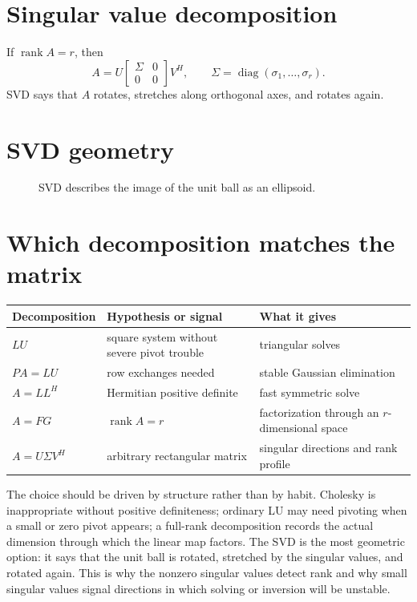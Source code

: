 \section{Singular value decomposition}
If \(\operatorname{rank}A=r\), then
\[
  A=U\begin{bmatrix}\Sigma&0\\0&0\end{bmatrix}V^H,\qquad
  \Sigma=\operatorname{diag}(\sigma_1,\ldots,\sigma_r).
\]
SVD says that \(A\) rotates, stretches along orthogonal axes, and rotates again.

\section{SVD geometry}
\begin{figure}[H]
\centering
{}
\caption{SVD describes the image of the unit ball as an ellipsoid.}
\end{figure}

\section{Which decomposition matches the matrix}

\begin{center}
\small
\begin{tabularx}{\textwidth}{@{}lYY@{}}
\toprule
Decomposition & Hypothesis or signal & What it gives\\
\midrule
\(LU\) & square system without severe pivot trouble & triangular solves\\
\(PA=LU\) & row exchanges needed & stable Gaussian elimination\\
\(A=LL^H\) & Hermitian positive definite & fast symmetric solve\\
\(A=FG\) & \(\operatorname{rank}A=r\) & factorization through an \(r\)-dimensional space\\
\(A=U\Sigma V^H\) & arbitrary rectangular matrix & singular directions and rank profile\\
\bottomrule
\end{tabularx}
\end{center}
The choice should be driven by structure rather than by habit.  Cholesky is inappropriate without positive definiteness; ordinary LU may need pivoting when a small or zero pivot appears; a full-rank decomposition records the actual dimension through which the linear map factors.  The SVD is the most geometric option: it says that the unit ball is rotated, stretched by the singular values, and rotated again.  This is why the nonzero singular values detect rank and why small singular values signal directions in which solving or inversion will be unstable.
